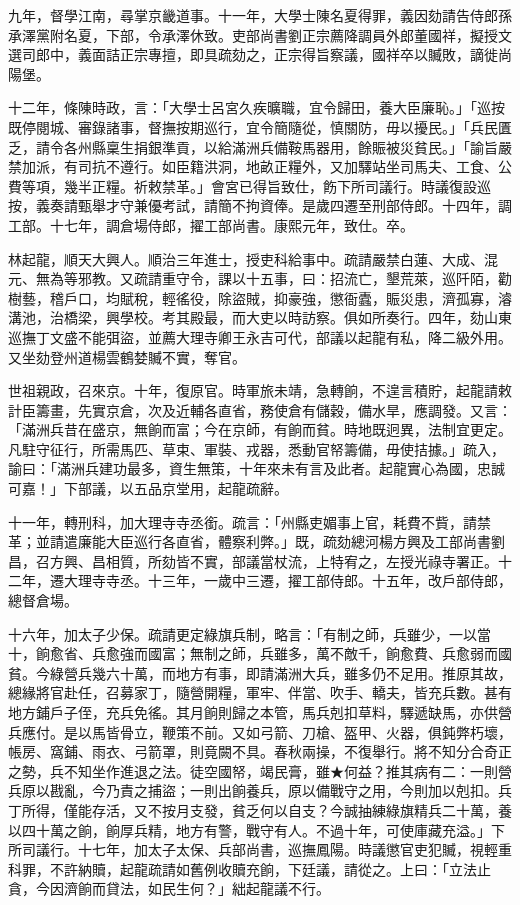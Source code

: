 \begin{pinyinscope}
九年，督學江南，尋掌京畿道事。十一年，大學士陳名夏得罪，義因劾請告侍郎孫承澤黨附名夏，下部，令承澤休致。吏部尚書劉正宗薦降調員外郎董國祥，擬授文選司郎中，義面詰正宗專擅，即具疏劾之，正宗得旨察議，國祥卒以贓敗，謫徙尚陽堡。

十二年，條陳時政，言：「大學士呂宮久疾曠職，宜令歸田，養大臣廉恥。」「巡按既停閱城、審錄諸事，督撫按期巡行，宜令簡隨從，慎關防，毋以擾民。」「兵民匱乏，請令各州縣稟生捐銀準貢，以給滿洲兵備鞍馬器用，餘賑被災貧民。」「諭旨嚴禁加派，有司抗不遵行。如臣籍洪洞，地畝正糧外，又加驛站坐司馬夫、工食、公費等項，幾半正糧。祈敕禁革。」會宮已得旨致仕，飭下所司議行。時議復設巡按，義奏請甄舉才守兼優考試，請簡不拘資俸。是歲四遷至刑部侍郎。十四年，調工部。十七年，調倉場侍郎，擢工部尚書。康熙元年，致仕。卒。

林起龍，順天大興人。順治三年進士，授吏科給事中。疏請嚴禁白蓮、大成、混元、無為等邪教。又疏請重守令，課以十五事，曰：招流亡，墾荒萊，巡阡陌，勸樹藝，稽戶口，均賦稅，輕徭役，除盜賊，抑豪強，懲衙蠹，賑災患，濟孤寡，濬溝池，治橋梁，興學校。考其殿最，而大吏以時訪察。俱如所奏行。四年，劾山東巡撫丁文盛不能弭盜，並薦大理寺卿王永吉可代，部議以起龍有私，降二級外用。又坐劾登州道楊雲鶴婪贓不實，奪官。

世祖親政，召來京。十年，復原官。時軍旅未靖，急轉餉，不遑言積貯，起龍請敕計臣籌畫，先實京倉，次及近輔各直省，務使倉有儲穀，備水旱，應調發。又言：「滿洲兵昔在盛京，無餉而富；今在京師，有餉而貧。時地既迥異，法制宜更定。凡駐守征行，所需馬匹、草束、軍裝、戎器，悉動官帑籌備，毋使拮據。」疏入，諭曰：「滿洲兵建功最多，資生無策，十年來未有言及此者。起龍實心為國，忠誠可嘉！」下部議，以五品京堂用，起龍疏辭。

十一年，轉刑科，加大理寺寺丞銜。疏言：「州縣吏媚事上官，耗費不貲，請禁革；並請遣廉能大臣巡行各直省，體察利弊。」既，疏劾總河楊方興及工部尚書劉昌，召方興、昌相質，所劾皆不實，部議當杖流，上特宥之，左授光祿寺署正。十二年，遷大理寺寺丞。十三年，一歲中三遷，擢工部侍郎。十五年，改戶部侍郎，總督倉場。

十六年，加太子少保。疏請更定綠旗兵制，略言：「有制之師，兵雖少，一以當十，餉愈省、兵愈強而國富；無制之師，兵雖多，萬不敵千，餉愈費、兵愈弱而國貧。今綠營兵幾六十萬，而地方有事，即請滿洲大兵，雖多仍不足用。推原其故，總緣將官赴任，召募家丁，隨營開糧，軍牢、伴當、吹手、轎夫，皆充兵數。甚有地方鋪戶子侄，充兵免徭。其月餉則歸之本管，馬兵剋扣草料，驛遞缺馬，亦供營兵應付。是以馬皆骨立，鞭策不前。又如弓箭、刀槍、盔甲、火器，俱鈍弊朽壞，帳房、窩鋪、雨衣、弓箭罩，則竟闕不具。春秋兩操，不復舉行。將不知分合奇正之勢，兵不知坐作進退之法。徒空國帑，竭民膏，雖★何益？推其病有二：一則營兵原以戡亂，今乃責之捕盜；一則出餉養兵，原以備戰守之用，今則加以剋扣。兵丁所得，僅能存活，又不按月支發，貧乏何以自支？今誠抽練綠旗精兵二十萬，養以四十萬之餉，餉厚兵精，地方有警，戰守有人。不過十年，可使庫藏充溢。」下所司議行。十七年，加太子太保、兵部尚書，巡撫鳳陽。時議懲官吏犯贓，視輕重科罪，不許納贖，起龍疏請如舊例收贖充餉，下廷議，請從之。上曰：「立法止貪，今因濟餉而貸法，如民生何？」絀起龍議不行。


\end{pinyinscope}

